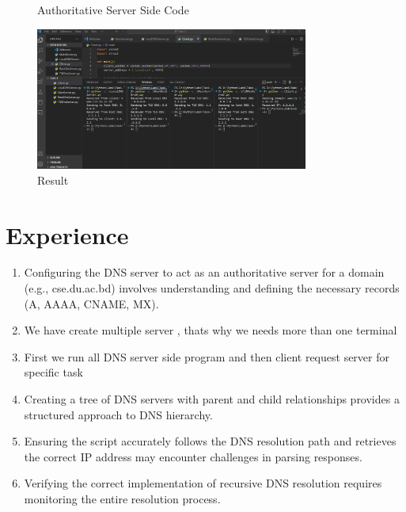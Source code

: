\documentclass[11pt]{article}
\begin{document}
\begin{itemize}
\begin{itemize}
\begin{figure}[H]
        \caption{Authoritative Server Side Code}
        \label{fig:2}
    \end{figure}
     \begin{figure}[H]
        \centering
        \includegraphics[width=0.8\textwidth]{result.png}
        \caption{Result}
        \label{fig:2}
    \end{figure}
    
    

\end{itemize}





\newpage
\section{Experience}
\begin{enumerate}
    \item  Configuring the DNS server to act as an authoritative server for a domain (e.g., cse.du.ac.bd) involves understanding and defining the necessary records (A, AAAA, CNAME, MX).
    \item We have create multiple server , thats why we needs more than one terminal 
    \item First we run all DNS server side program and then client request server for specific task
    \item Creating a tree of DNS servers with parent and child relationships provides a structured approach to DNS hierarchy.
    \item Ensuring the script accurately follows the DNS resolution path and retrieves the correct IP address may encounter challenges in parsing responses.
    \item Verifying the correct implementation of recursive DNS resolution requires monitoring the entire resolution process.
\end{enumerate}






\end{itemize}
\end{document}
